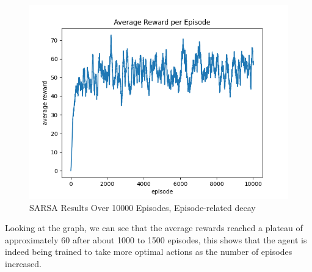 \begin{figure}[H] %
    \centering
    \includegraphics[width=1\linewidth]{sarsa-average-10k-epsilon05.png}
    \caption{SARSA Results Over 10000 Episodes, Episode-related decay}
\end{figure}

Looking at the graph, we can see that the average rewards reached a plateau of approximately 60 after about 1000 to 1500 episodes, this shows that the agent is indeed being trained to
take more optimal actions as the number of episodes increased.




